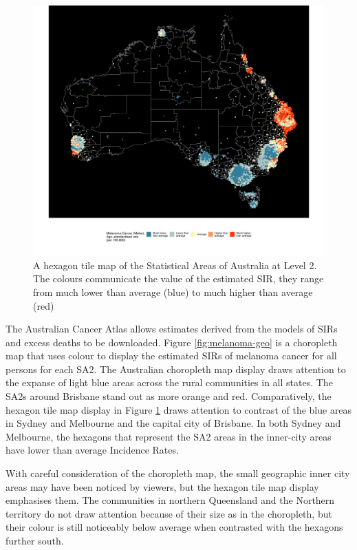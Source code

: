 \documentclass{monashthesis}
\begin{document}
\begin{figure}[H]
\centering
\includegraphics[width=14cm]{figures/03-algorithm/aus_gghexmap.pdf}
\caption{\label{fig:melanoma-hex}A hexagon tile map of the Statistical Areas of Australia at Level 2. The colours communicate the value of the estimated SIR, they range from much lower than average (blue) to much higher than average (red)}
\end{figure}

The Australian Cancer Atlas \autocite{TACA} allows estimates derived from the models of SIRs and excess deaths to be downloaded.
Figure \ref{fig:melanoma-geo} is a choropleth map that uses colour to display the estimated SIRs of melanoma cancer for all persons for each SA2. The Australian choropleth map display draws attention to the expanse of light blue areas across the rural communities in all states. The SA2s around Brisbane stand out as more orange and red.
Comparatively, the hexagon tile map display in Figure \ref{fig:melanoma-hex} draws attention to contrast of the blue areas in Sydney and Melbourne and the capital city of Brisbane. In both Sydney and Melbourne, the hexagons that represent the SA2 areas in the inner-city areas have lower than average Incidence Rates.

With careful consideration of the choropleth map, the small geographic inner city areas may have been noticed by viewers, but the hexagon tile map display emphasises them. The communities in northern Queensland and the Northern territory do not draw attention because of their size as in the choropleth, but their colour is still noticeably below average when contrasted with the hexagons further south.
\end{document}
